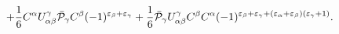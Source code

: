 \begin{equation}
+\frac{1}{6}C^\alpha U^\gamma_{\alpha\beta}\bar{\cal P}_\gamma C^\beta
(-1)^{\varepsilon_\beta+\varepsilon_\gamma}+
\frac{1}{6}\bar{\cal P}_\gamma U^\gamma_{\alpha\beta} C^\beta C^\alpha
(-1)^{\varepsilon_\beta+\varepsilon_\gamma+
(\varepsilon_\alpha+\varepsilon_\beta)(\varepsilon_\gamma+1)}.
\label{5.1}
\end{equation}

